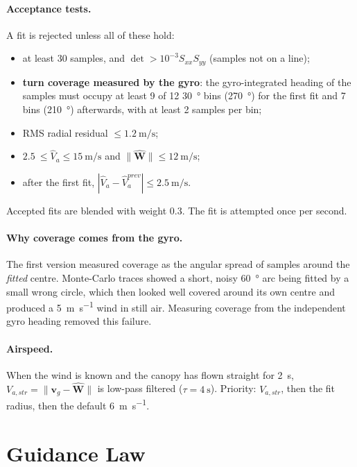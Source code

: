 \documentclass[11pt,a4paper]{article}
\newcommand{\vect}[1]{\mathbf{#1}}
\begin{document}
\paragraph{Acceptance tests.} A fit is rejected unless all of these hold:
\begin{itemize}
  \item at least 30 samples, and $\det > 10^{-3} S_{xx}S_{yy}$ (samples not on a line);
  \item \textbf{turn coverage measured by the gyro}: the gyro-integrated
        heading of the samples must occupy at least 9 of 12 \SI{30}{\degree}
        bins (\SI{270}{\degree}) for the first fit and 7 bins
        (\SI{210}{\degree}) afterwards, with at least 2 samples per bin;
  \item RMS radial residual $\le \SI{1.2}{\meter\per\second}$;
  \item $\SI{2.5}{} \le \hat V_a \le \SI{15}{\meter\per\second}$ and $\lVert\hat{\vect W}\rVert \le \SI{12}{\meter\per\second}$;
  \item after the first fit, $|\hat V_a - \hat V_a^{prev}| \le \SI{2.5}{\meter\per\second}$.
\end{itemize}
Accepted fits are blended with weight 0.3. The fit is attempted once per
second.

\paragraph{Why coverage comes from the gyro.} The first version measured
coverage as the angular spread of samples around the \emph{fitted} centre.
Monte-Carlo traces showed a short, noisy \SI{60}{\degree} arc being fitted by
a small wrong circle, which then looked well covered around its own centre
and produced a \SI{5}{\meter\per\second} wind in still air. Measuring coverage
from the independent gyro heading removed this failure.

\paragraph{Airspeed.} When the wind is known and the canopy has flown
straight for \SI{2}{\second}, $V_{a,str} = \lVert \vect v_g - \hat{\vect W}\rVert$
is low-pass filtered ($\tau = \SI{4}{\second}$). Priority:
$V_{a,str}$, then the fit radius, then the default \SI{6}{\meter\per\second}.

\section{Guidance Law}
\end{document}
